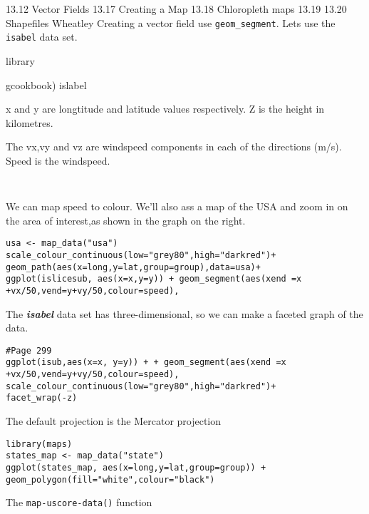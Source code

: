 13.12 Vector Fields
13.17 Creating a Map
13.18 Chloropleth maps
13.19 
13.20 Shapefiles
Wheatley
Creating a vector field
use \texttt{geom_segment}. Lets use the \texttt{isabel} data set.


library{gcookbook)
islabel

x and y are longtitude and latitude values respectively.
Z is the height in kilometres.

The vx,vy and vz are windspeed components in each of the directions (m/s).
Speed is the windspeed.

\begin{framed}
\begin{verbatim}


\end{verbatim}
\end{framed}

We can map speed to colour. We'll also ass a map of 
the USA and zoom in on the area of interest,as shown in the graph on the right.

\begin{verbatim}
usa <- map_data("usa")
scale_colour_continuous(low="grey80",high="darkred")+
geom_path(aes(x=long,y=lat,group=group),data=usa)+
ggplot(islicesub, aes(x=x,y=y)) + geom_segment(aes(xend =x +vx/50,vend=y+vy/50,colour=speed),
\end{verbatim}
The \textbf{\textit{isabel}} data set has three-dimensional, so we can make a faceted graph of the data.

\begin{verbatim}
#Page 299
ggplot(isub,aes(x=x, y=y)) + + geom_segment(aes(xend =x +vx/50,vend=y+vy/50,colour=speed),
scale_colour_continuous(low="grey80",high="darkred")+
facet_wrap(-z)
\end{verbatim}


The default projection is the Mercator projection

\begin{verbatim}
library(maps)
states_map <- map_data("state")
ggplot(states_map, aes(x=long,y=lat,group=group)) + geom_polygon(fill="white",colour="black")
\end{verbatim}

The \texttt{map-uscore-data()} function

}
